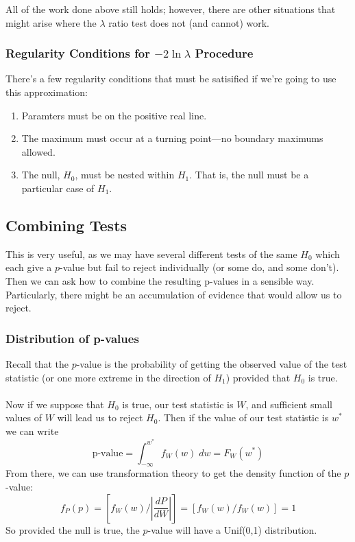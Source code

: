 \documentclass[a4paper,12pt]{scrartcl}
\begin{document}
All of the work done above still holds; however, there are other 
situations that might arise where the $\lambda$ ratio test
does not (and cannot) work. 


\subsubsection{Regularity Conditions for $-2 \ln \lambda$ Procedure}

There's a few regularity conditions that must be satisified if we're
going to use this approximation:
\begin{enumerate}
   \item Paramters must be on the positive real line.
   \item The maximum must occur at a turning point---no boundary
      maximums allowed.
   \item The null, $H_0$, must be nested within $H_1$. That is,
      the null must be a particular case of $H_1$.
\end{enumerate}



\newpage
\subsection{Combining Tests}

This is very useful, as we may have several different tests of the
same $H_0$ which each
give a $p$-value but fail to reject individually (or some do, and some 
don't).  Then we can ask how to combine the resulting p-values in a 
sensible way. Particularly, there might be an accumulation of evidence 
that would allow us to reject.

\subsubsection{Distribution of p-values}

Recall that the $p$-value is the probability of getting the observed
value of the test statistic (or one more extreme in the direction of 
$H_1$) provided that $H_0$ is true. 
\\
\\
Now if we suppose that $H_0$
is true, our test statistic is $W$, and sufficient small values of 
$W$ will lead us to reject $H_0$. Then if the value of our
test statistic is $w^*$ we can write
   \[\text{p-value} = \int^{w^*}_{-\infty} f_W(w) \; dw = F_W(w^*)\]
From there, we can use transformation theory to get the density 
function of the $p$-value:
\[ f_P(p) = \left[ f_W(w) / \left\lvert \frac{dP}{dW}\right\rvert\right]
   = \left[ f_W(w) /f_W(w) \right] =1  \]
So provided the null is true, the $p$-value will have a Unif(0,1)
distribution.
\end{document}
